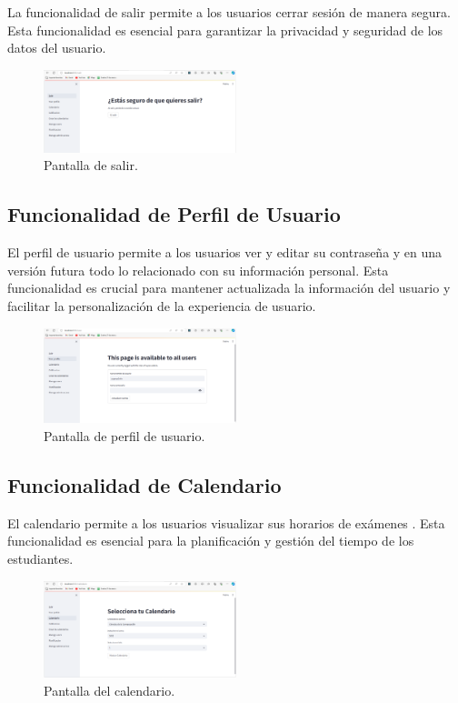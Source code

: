 \documentclass{article}
\begin{document}
La funcionalidad de salir permite a los usuarios cerrar sesión de manera segura. Esta funcionalidad es esencial para garantizar la privacidad y seguridad de los datos del usuario.

\begin{figure}[h!] \centering \includegraphics[width=0.5\textwidth]{salir.png} \caption{Pantalla de salir.} \end{figure}

\subsection{Funcionalidad de Perfil de Usuario}

El perfil de usuario permite a los usuarios ver y editar su contraseña y en una versión futura todo lo relacionado con su  información personal. Esta funcionalidad es crucial para mantener actualizada la información del usuario y facilitar la personalización de la experiencia de usuario.

\begin{figure}[h!] \centering \includegraphics[width=0.5\textwidth]{perfil_usuario.png} \caption{Pantalla de perfil de usuario.} \end{figure}

\subsection{Funcionalidad de Calendario}

El calendario permite a los usuarios visualizar sus horarios de exámenes . Esta funcionalidad es esencial para la planificación y gestión del tiempo de los estudiantes.

\begin{figure}[H] \centering \includegraphics[width=0.5\textwidth]{calendario.png} \caption{Pantalla del calendario.} \end{figure}
\end{document}
